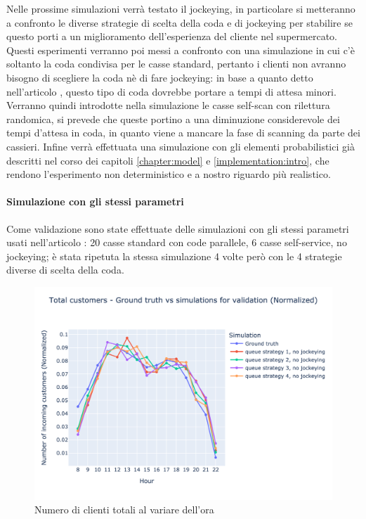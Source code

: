 Nelle prossime simulazioni verrà testato il jockeying, in particolare
si metteranno a confronto le diverse strategie di scelta della coda e
di jockeying per stabilire se questo porti a un miglioramento
dell'esperienza del cliente nel supermercato. Questi esperimenti
verranno poi messi a confronto con una simulazione in cui c'è soltanto
la coda condivisa per le casse standard, pertanto i clienti non
avranno bisogno di scegliere la coda nè di fare jockeying: in base a
quanto detto nell'articolo \cite{yanagisawa2011methods}, questo tipo
di coda dovrebbe portare a tempi di attesa minori.  Verranno quindi
introdotte nella simulazione le casse self-scan con rilettura
randomica, si prevede che queste portino a una diminuzione
considerevole dei tempi d'attesa in coda, in quanto viene a mancare la
fase di scanning da parte dei cassieri. Infine verrà effettuata una
simulazione con gli elementi probabilistici già descritti nel corso
dei capitoli \ref{chapter:model} e \ref{implementation:intro}, che
rendono l'esperimento non deterministico e a nostro riguardo più
realistico.

\paragraph{Simulazione con gli stessi parametri}

Come validazione sono state effettuate delle simulazioni con gli stessi parametri usati nell'articolo \cite{article1}: 20 casse standard con code parallele, 6 casse self-service, no jockeying; è stata ripetuta la stessa simulazione 4 volte però con le 4 strategie diverse di scelta della coda.

\begin{figure}[H]
	\centering
	\includegraphics[width=12cm]{"images/results/total_customers_validation.png"}
	\caption{Numero di clienti totali al variare dell'ora}
	\label{fig:total_customers_validation}
\end{figure}

